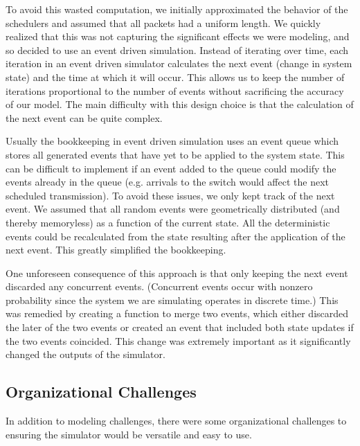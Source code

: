 \documentclass[11pt]{article}%
\begin{document}
 To avoid this wasted computation, we initially approximated the behavior of the schedulers and assumed that all packets had a uniform length.  We quickly realized that this was not capturing the significant effects we were modeling, and so decided to use an event driven simulation.  Instead of iterating over time, each iteration in an event driven simulator calculates the next event (change in system state) and the time at which it will occur.  This allows us to keep the number of iterations proportional to the number of events  without sacrificing the accuracy of our model.  The main difficulty with this design choice is that the calculation of the next event can be quite complex.
 
Usually the bookkeeping in event driven simulation uses an event queue which stores all generated events that have yet to be applied to the system state.  This can be difficult to implement if an event added to the queue could modify the events already in the queue (e.g. arrivals to the switch would affect the next scheduled transmission).  To avoid these issues, we only kept track of the next event.  We assumed that all random events were geometrically distributed (and thereby memoryless) as a function of the current state.  All the deterministic events could be recalculated from the state resulting after the application of the next event.  This greatly simplified the bookkeeping.

One unforeseen consequence of this approach is that only keeping the next event discarded any concurrent events.  (Concurrent events occur with nonzero probability since the system we are simulating operates in discrete time.)  This was remedied by creating a function to merge two events, which either discarded the later of the two events or created an event that included both state updates if the two events coincided.  This change was extremely important as it significantly changed the outputs of the simulator.

\subsection{Organizational Challenges}
In addition to modeling challenges, there were some organizational challenges to ensuring the simulator would be versatile and easy to use.  
\end{document}
